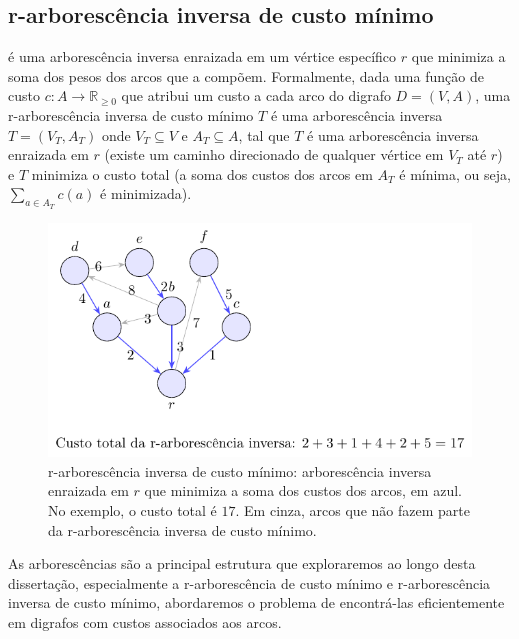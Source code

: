 \subsection{r-arborescência inversa de custo mínimo}
é uma arborescência inversa enraizada em um vértice específico \(r\) que minimiza a soma dos pesos dos arcos que a compõem. Formalmente, dada uma função de custo \(c: A \to \mathbb{R}_{\geq 0}\) que atribui um custo a cada arco do digrafo \(D = (V, A)\), uma r-arborescência inversa de custo mínimo \(T\) é uma arborescência inversa \(T = (V_T, A_T)\) onde \(V_T \subseteq V\) e \(A_T \subseteq A\), tal que \(T\) é uma arborescência inversa enraizada em \(r\) (existe um caminho direcionado de qualquer vértice em \(V_T\) até \(r\)) e \(T\) minimiza o custo total (a soma dos custos dos arcos em \(A_T\) é mínima, ou seja, \(\sum_{a \in A_T} c(a)\) é minimizada).



\begin{figure}[H]
	\centering
	\includegraphics[width=0.9\linewidth]{figures/fig_r_arborescencia_inversa_custo_minimo.pdf}

	\caption{r-arborescência inversa de custo mínimo: arborescência inversa enraizada em $r$ que minimiza a soma dos custos dos arcos, em azul. No exemplo, o custo total é $17$. Em cinza, arcos que não fazem parte da r-arborescência inversa de custo mínimo.}
	\label{fig:r-arborescencia-inversa-custo-minimo}\end{figure}



As arborescências são a principal estrutura que exploraremos ao longo desta dissertação, especialmente a r-arborescência de custo mínimo e r-arborescência inversa de custo mínimo, abordaremos o problema de encontrá-las eficientemente em digrafos com custos associados aos arcos.



